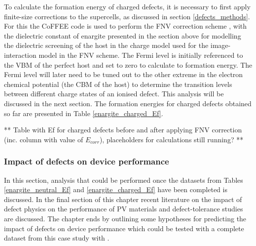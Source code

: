 \documentclass[11pt, twoside]{report}
\begin{document}
To calculate the formation energy of charged defects, it is necessary to first apply finite-size corrections to the supercells, as discussed in section \ref{defects_methods}. For this the CoFFEE code \cite{coFFEE} is used to perform the FNV correction scheme \cite{FNV}, with the dielectric constant of enargite presented in the section above for modelling the dielectric screening of the host in the charge model used for the image-interaction model in the FNV scheme. 
The Fermi level is initially referenced to the VBM of the perfect host and set to zero to calculate to formation energy. The Fermi level will later need to be tuned out to the other extreme in the electron chemical potential (the CBM of the host) to determine the transition levels between different charge states of an ionised defect. This analysis will be discussed in the next section. The formation energies for charged defects obtained so far are presented in Table \ref{enargite_charged_Ef}.




** Table with Ef for charged defects before and after applying FNV correction (inc. column with value of $E_{corr}$), placeholders for calculations still running? **\\



\subsubsection{Impact of defects on device performance}
In this section, analysis that could be performed once the datasets from Tables \ref{enargite_neutral_Ef} and \ref{enargite_charged_Ef} have been completed is discussed. In the final section of this chapter recent literature on the impact of defect physics on the performance of PV materials and defect-tolerance studies are discussed. The chapter ends by outlining some hypotheses for predicting the impact of defects on device performance which could be tested with a complete dataset from this case study with {\enargite}.
\end{document}
